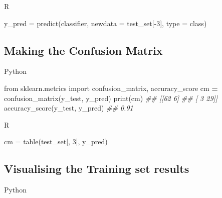 \documentclass[
]{book}
\newenvironment{Shaded}{\begin{snugshade}}{\end{snugshade}}
\newcommand{\AttributeTok}[1]{\textcolor[rgb]{0.77,0.63,0.00}{#1}}
\newcommand{\BuiltInTok}[1]{#1}
\newcommand{\CommentTok}[1]{\textcolor[rgb]{0.56,0.35,0.01}{\textit{#1}}}
\newcommand{\DecValTok}[1]{\textcolor[rgb]{0.00,0.00,0.81}{#1}}
\newcommand{\FunctionTok}[1]{\textcolor[rgb]{0.00,0.00,0.00}{#1}}
\newcommand{\ImportTok}[1]{#1}
\newcommand{\NormalTok}[1]{#1}
\newcommand{\OperatorTok}[1]{\textcolor[rgb]{0.81,0.36,0.00}{\textbf{#1}}}
\newcommand{\OtherTok}[1]{\textcolor[rgb]{0.56,0.35,0.01}{#1}}
\newcommand{\SpecialCharTok}[1]{\textcolor[rgb]{0.00,0.00,0.00}{#1}}
\newcommand{\StringTok}[1]{\textcolor[rgb]{0.31,0.60,0.02}{#1}}
\theoremstyle{definition}
\theoremstyle{definition}
\theoremstyle{definition}
\theoremstyle{definition}
\theoremstyle{remark}
\begin{document}
R

\begin{Shaded}
\begin{Highlighting}[]
\NormalTok{y\_pred }\OtherTok{=} \FunctionTok{predict}\NormalTok{(classifier, }\AttributeTok{newdata =}\NormalTok{ test\_set[}\SpecialCharTok{{-}}\DecValTok{3}\NormalTok{], }\AttributeTok{type =} \StringTok{\textquotesingle{}class\textquotesingle{}}\NormalTok{)}
\end{Highlighting}
\end{Shaded}

\hypertarget{making-the-confusion-matrix-5}{%
\subsection{Making the Confusion Matrix}\label{making-the-confusion-matrix-5}}

Python

\begin{Shaded}
\begin{Highlighting}[]
\ImportTok{from}\NormalTok{ sklearn.metrics }\ImportTok{import}\NormalTok{ confusion\_matrix, accuracy\_score}
\NormalTok{cm }\OperatorTok{=}\NormalTok{ confusion\_matrix(y\_test, y\_pred)}
\BuiltInTok{print}\NormalTok{(cm)}
\CommentTok{\#\# [[62  6]}
\CommentTok{\#\#  [ 3 29]]}
\NormalTok{accuracy\_score(y\_test, y\_pred)}
\CommentTok{\#\# 0.91}
\end{Highlighting}
\end{Shaded}

R

\begin{Shaded}
\begin{Highlighting}[]
\NormalTok{cm }\OtherTok{=} \FunctionTok{table}\NormalTok{(test\_set[, }\DecValTok{3}\NormalTok{], y\_pred)}
\end{Highlighting}
\end{Shaded}

\hypertarget{visualising-the-training-set-results-6}{%
\subsection{Visualising the Training set results}\label{visualising-the-training-set-results-6}}

Python
\end{document}
